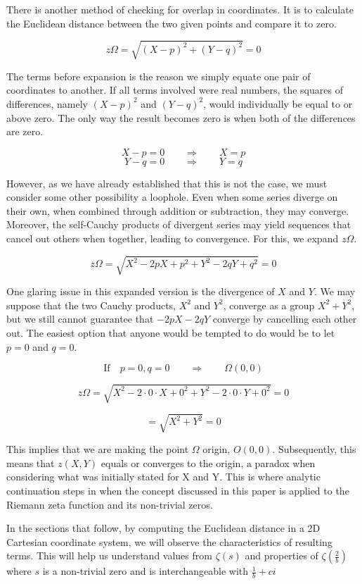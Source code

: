 \documentclass{amsart}
\begin{document}
	There is another method of checking for overlap in coordinates. It is to calculate the Euclidean distance between the two given points and compare it to zero.
	
	\[ z\Omega = \sqrt{(X-p)^2 + (Y-q)^2} = 0 \]
	
	The terms before expansion is the reason we simply equate one pair of coordinates to another. If all terms involved were real numbers, the squares of differences, namely $(X-p)^2$ and $(Y-q)^2$, would individually be equal to or above zero. The only way the result becomes zero is when both of the differences are zero.
	
	\[ X-p=0 \qquad \Rightarrow \qquad X=p  \]
	\[ Y-q=0 \qquad \Rightarrow \qquad Y=q  \]
	
	However, as we have already established that this is not the case, we must consider some other possibility a loophole. Even when some series diverge on their own, when combined through addition or subtraction, they may converge. Moreover, the self-Cauchy products of divergent series may yield sequences that cancel out others when together, leading to convergence. For this, we expand $z\Omega$.
	
	\[ z\Omega = \sqrt{X^2 - 2pX + p^2 + Y^2 - 2qY + q^2} = 0 \]
	
	One glaring issue in this expanded version is the divergence of $X$ and $Y$. We may suppose that the two Cauchy products, $X^2$ and $Y^2$, converge as a group $X^2+Y^2$, but we still cannot guarantee that $-2pX-2qY$ converge by cancelling each other out. The easiest option that anyone would be tempted to do would be to let $p=0$ and $q=0$.
	
	\[ \text{If} \quad p=0, q=0 \qquad \Rightarrow \qquad \Omega(0,0) \]
	
	\[ z\Omega = \sqrt{X^2 - 2 \cdot 0 \cdot X + 0^2 + Y^2 - 2 \cdot 0 \cdot Y + 0^2} = 0 \]
	
	\[ = \sqrt{X^2 + Y^2} = 0 \]
	
	This implies that we are making the point $\Omega$ origin, $O(0,0)$. Subsequently, this means that $z(X,Y)$ equals or converges to the origin, a paradox when considering what was initially stated for X and Y. This is where analytic continuation steps in when the concept discussed in this paper is applied to the Riemann zeta function and its non-trivial zeros.
	
	In the sections that follow, by computing the Euclidean distance in a 2D Cartesian coordinate system, we will observe the characteristics of resulting terms. This will help us understand values from $\zeta(s)$ and properties of $\zeta(\frac{2}{b})$ where $s$ is a non-trivial zero and is interchangeable with $\frac{1}{b} + ci$
	\[\]
	
\end{document}
